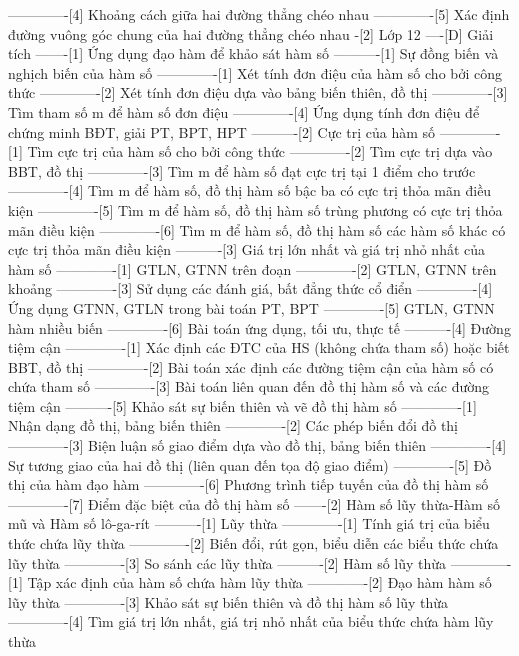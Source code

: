 -------------[4] Khoảng cách giữa hai đường thẳng chéo nhau
-------------[5] Xác định đường vuông góc chung của hai đường thẳng chéo nhau
-[2] Lớp 12
----[D] Giải tích
-------[1] Ứng dụng đạo hàm để khảo sát hàm số
----------[1] Sự đồng biến và nghịch biến của hàm số
-------------[1] Xét tính đơn điệu của hàm số cho bởi công thức
-------------[2] Xét tính đơn điệu dựa vào bảng biến thiên, đồ thị
-------------[3] Tìm tham số m để hàm số đơn điệu
-------------[4] Ứng dụng tính đơn điệu để chứng minh BĐT, giải PT, BPT, HPT
----------[2] Cực trị của hàm số
-------------[1] Tìm cực trị của hàm số cho bởi công thức
-------------[2] Tìm cực trị dựa vào BBT, đồ thị
-------------[3] Tìm m để hàm số đạt cực trị tại 1 điểm cho trước
-------------[4] Tìm m để hàm số, đồ thị hàm số bậc ba có cực trị thỏa mãn điều kiện
-------------[5] Tìm m để hàm số, đồ thị hàm số trùng phương có cực trị thỏa mãn điều kiện
-------------[6] Tìm m để hàm số, đồ thị hàm số các hàm số khác có cực trị thỏa mãn điều kiện
----------[3] Giá trị lớn nhất và giá trị nhỏ nhất của hàm số
-------------[1] GTLN, GTNN trên đoạn
-------------[2] GTLN, GTNN trên khoảng
-------------[3] Sử dụng các đánh giá, bất đẳng thức cổ điển
-------------[4] Ứng dụng GTNN, GTLN trong bài toán PT, BPT
-------------[5] GTLN, GTNN hàm nhiều biến
-------------[6] Bài toán ứng dụng, tối ưu, thực tế
----------[4] Đường tiệm cận
-------------[1] Xác định các ĐTC của HS (không chứa tham số) hoặc biết BBT, đồ thị
-------------[2] Bài toán xác định các đường tiệm cận của hàm số có chứa tham số
-------------[3] Bài toán liên quan đến đồ thị hàm số và các đường tiệm cận
----------[5] Khảo sát sự biến thiên và vẽ đồ thị hàm số
-------------[1] Nhận dạng đồ thị, bảng biến thiên
-------------[2] Các phép biến đổi đồ thị
-------------[3] Biện luận số giao điểm dựa vào đồ thị, bảng biến thiên
-------------[4] Sự tương giao của hai đồ thị (liên quan đến tọa độ giao điểm)
-------------[5] Đồ thị của hàm đạo hàm
-------------[6] Phương trình tiếp tuyến của đồ thị hàm số
-------------[7] Điểm đặc biệt của đồ thị hàm số
-------[2] Hàm số lũy thừa-Hàm số mũ và Hàm số lô-ga-rít
----------[1] Lũy thừa
-------------[1] Tính giá trị của biểu thức chứa lũy thừa
-------------[2] Biến đổi, rút gọn, biểu diễn các biểu thức chứa lũy thừa
-------------[3] So sánh các lũy thừa
----------[2] Hàm số lũy thừa
-------------[1] Tập xác định của hàm số chứa hàm lũy thừa
-------------[2] Đạo hàm hàm số lũy thừa
-------------[3] Khảo sát sự biến thiên và đồ thị hàm số lũy thừa
-------------[4] Tìm giá trị lớn nhất, giá trị nhỏ nhất của biểu thức chứa hàm lũy thừa
